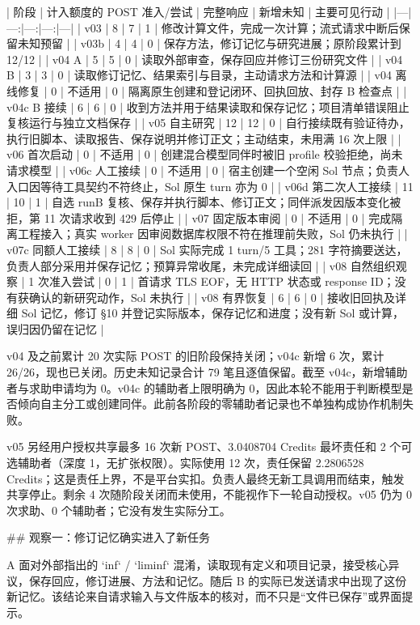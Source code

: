 | 阶段 | 计入额度的 POST 准入/尝试 | 完整响应 | 新增未知 | 主要可见行动 |
|---|---:|---:|---:|---|
| v03 | 8 | 7 | 1 | 修改计算文件，完成一次计算；流式请求中断后保留未知预留 |
| v03b | 4 | 4 | 0 | 保存方法，修订记忆与研究进展；原阶段累计到 12/12 |
| v04 A | 5 | 5 | 0 | 读取外部审查，保存回应并修订三份研究文件 |
| v04 B | 3 | 3 | 0 | 读取修订记忆、结果索引与目录，主动请求方法和计算源 |
| v04 离线修复 | 0 | 不适用 | 0 | 隔离原生创建和登记闭环、回执回放、封存 B 检查点 |
| v04c B 接续 | 6 | 6 | 0 | 收到方法并用于结果读取和保存记忆；项目清单错误阻止复核运行与独立文档保存 |
| v05 自主研究 | 12 | 12 | 0 | 自行接续既有验证待办，执行旧脚本、读取报告、保存说明并修订正文；主动结束，未用满 16 次上限 |
| v06 首次启动 | 0 | 不适用 | 0 | 创建混合模型同伴时被旧 profile 校验拒绝，尚未请求模型 |
| v06c 人工接续 | 0 | 不适用 | 0 | 宿主创建一个空闲 Sol 节点；负责人入口因等待工具契约不符终止，Sol 原生 turn 亦为 0 |
| v06d 第二次人工接续 | 11 | 10 | 1 | 自选 runB 复核、保存并执行脚本、修订正文；同伴派发因版本变化被拒，第 11 次请求收到 429 后停止 |
| v07 固定版本审阅 | 0 | 不适用 | 0 | 完成隔离工程接入；真实 worker 因审阅数据库权限不符在推理前失败，Sol 仍未执行 |
| v07c 同额人工接续 | 8 | 8 | 0 | Sol 实际完成 1 turn/5 工具；281 字符摘要送达，负责人部分采用并保存记忆；预算异常收尾，未完成详细读回 |
| v08 自然组织观察 | 1 次准入尝试 | 0 | 1 | 首请求 TLS EOF，无 HTTP 状态或 response ID；没有获确认的新研究动作，Sol 未执行 |
| v08 有界恢复 | 6 | 6 | 0 | 接收旧回执及详细 Sol 记忆，修订 §10 并登记实际版本，保存记忆和进度；没有新 Sol 或计算，误归因仍留在记忆 |

v04 及之前累计 20 次实际 POST 的旧阶段保持关闭；v04c 新增 6 次，累计 26/26，现也已关闭。历史未知记录合计 79 笔且逐值保留。截至 v04c，新增辅助者与求助申请均为 0。v04c 的辅助者上限明确为 0，因此本轮不能用于判断模型是否倾向自主分工或创建同伴。此前各阶段的零辅助者记录也不单独构成协作机制失败。

v05 另经用户授权共享最多 16 次新 POST、3.0408704 Credits 最坏责任和 2 个可选辅助者（深度 1，无扩张权限）。实际使用 12 次，责任保留 2.2806528 Credits；这是责任上界，不是平台实扣。负责人最终无新工具调用而结束，触发共享停止。剩余 4 次随阶段关闭而未使用，不能视作下一轮自动授权。v05 仍为 0 次求助、0 个辅助者；它没有发生实际分工。

## 观察一：修订记忆确实进入了新任务

A 面对外部指出的 `inf` / `liminf` 混淆，读取现有定义和项目记录，接受核心异议，保存回应，修订进展、方法和记忆。随后 B 的实际已发送请求中出现了这份新记忆。该结论来自请求输入与文件版本的核对，而不只是“文件已保存”或界面提示。

